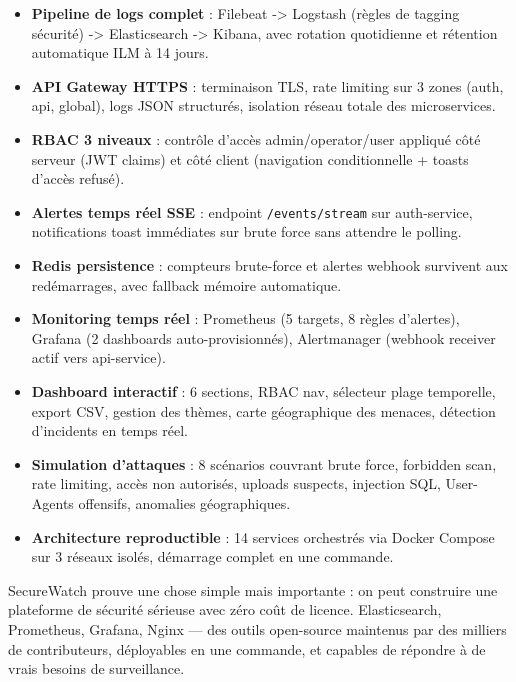 \documentclass[12pt, a4paper]{report}
\newcommand{\cmark}{\ding{51}}
\begin{document}
\begin{successbox}
\begin{itemize}[leftmargin=*]
  \item[\cmark] \textbf{Pipeline de logs complet} : Filebeat -> Logstash (règles de tagging sécurité) -> Elasticsearch -> Kibana, avec rotation quotidienne et rétention automatique ILM à 14 jours.
  \item[\cmark] \textbf{API Gateway HTTPS} : terminaison TLS, rate limiting sur 3 zones (auth, api, global), logs JSON structurés, isolation réseau totale des microservices.
  \item[\cmark] \textbf{RBAC 3 niveaux} : contrôle d'accès admin/operator/user appliqué côté serveur (JWT claims) et côté client (navigation conditionnelle + toasts d'accès refusé).
  \item[\cmark] \textbf{Alertes temps réel SSE} : endpoint \texttt{/events/stream} sur auth-service, notifications toast immédiates sur brute force sans attendre le polling.
  \item[\cmark] \textbf{Redis persistence} : compteurs brute-force et alertes webhook survivent aux redémarrages, avec fallback mémoire automatique.
  \item[\cmark] \textbf{Monitoring temps réel} : Prometheus (5 targets, 8 règles d'alertes), Grafana (2 dashboards auto-provisionnés), Alertmanager (webhook receiver actif vers api-service).
  \item[\cmark] \textbf{Dashboard interactif} : 6 sections, RBAC nav, sélecteur plage temporelle, export CSV, gestion des thèmes, carte géographique des menaces, détection d'incidents en temps réel.
  \item[\cmark] \textbf{Simulation d'attaques} : 8 scénarios couvrant brute force, forbidden scan, rate limiting, accès non autorisés, uploads suspects, injection SQL, User-Agents offensifs, anomalies géographiques.
  \item[\cmark] \textbf{Architecture reproductible} : 14 services orchestrés via Docker Compose sur 3 réseaux isolés, démarrage complet en une commande.
\end{itemize}
\end{successbox}

SecureWatch prouve une chose simple mais importante : on peut construire une plateforme de sécurité sérieuse avec zéro coût de licence. Elasticsearch, Prometheus, Grafana, Nginx — des outils open-source maintenus par des milliers de contributeurs, déployables en une commande, et capables de répondre à de vrais besoins de surveillance.
\end{document}
